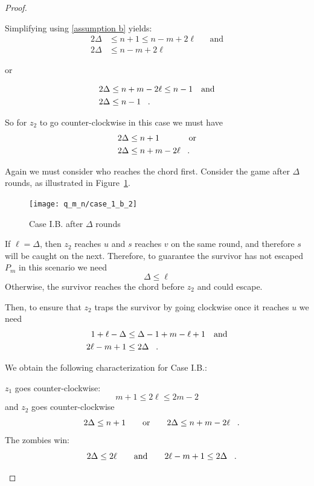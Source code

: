 \begin{proof}
\begin{proofpart}
\begin{itemize}
  Simplifying using \ref{assumption b} yields:
  \begin{align*}
   2 \Delta &\leq n+1 \leq n-m+2\ell && \text{and} \\
   2 \Delta &\leq n - m + 2\ell
  \end{align*}
  \begin{center}or\end{center}
  \begin{align*}
   2 \Delta &\leq n+m -2 \ell \leq n-1 && \text{and} \\
   2 \Delta &\leq n -1 \mperiod
  \end{align*}

  So for $z_2$ to go counter-clockwise in this case we must have
  \begin{align*}
   2 \Delta &\leq n + 1         && \text{or} \\
   2 \Delta &\leq n + m - 2\ell \mperiod
  \end{align*}

  Again we must consider who reaches the chord first. Consider the game after $\Delta$ rounds, as illustrated in Figure~\ref{fig:case_1_b_2}.

  \begin{figure}
    \centering
    \texttt{[image: q\_m\_n/case\_1\_b\_2]}
    \caption{Case I.B. after $\Delta$ rounds \label{fig:case_1_b_2}}
  \end{figure}

  If $\ell = \Delta$, then $z_2$ reaches $u$ and $s$ reaches $v$ on the same round, and therefore $s$ will be caught on the next. Therefore, to guarantee the survivor has not escaped $P_m$ in this scenario we need
  \[ \Delta \leq \ell\]
  Otherwise, the survivor reaches the chord before $z_2$ and could escape.

  Then, to ensure that $z_2$ traps the survivor by going clockwise once
  it reaches $u$ we need
  \begin{align*}
   1 + \ell - \Delta &\leq \Delta -1 + m - \ell + 1 && \text{and} \\
   2\ell - m + 1 &\leq 2 \Delta \mperiod
  \end{align*}

  We obtain the following characterization for Case I.B.:

  $z_1$ goes counter-clockwise:
  \[ m + 1 \leq 2 \ell \leq 2m - 2\]
  and $z_2$ goes counter-clockwise
  \[ 2 \Delta \leq n + 1 \qquad \text{or} \qquad 2 \Delta \leq n + m - 2\ell \mperiod\]
  The zombies win:
  \[ 2 \Delta \leq 2 \ell \qquad \text{and} \qquad 2\ell - m + 1 \leq 2 \Delta \mperiod\]


\end{itemize}
\end{proofpart}
\end{proof}
